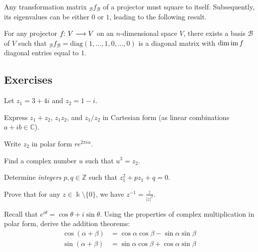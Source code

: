 \documentclass[a4paper, oneside, 12pt]{amsart}
\begin{document}
Any transformation matrix \(_{\mathcal{B}}f_{\mathcal{B}}\) of a projector must square to itself.
Subsequently, its eigenvalues can be either \(0\) or \(1\), leading to the following result.
\begin{proposition}\label{prop:matrix-representation-of-projection}
  For any projector \(f\from V \to V\) on an \(n\)-dimensional space \(V\), there exists a basis \(\mathcal{B}\) of \(V\) such that \(_{\mathcal{B}}f_{\mathcal{B}} = \mathrm{diag}(1, \dots , 1, 0, \dots , 0)\) is a diagonal matrix with \(\dim \operatorname{im} f\) diagonal entries equal to \(1\).
\end{proposition}


\cleardoublepage
\subsection{Exercises}\label{sec:lin-alg-exercises}
\begin{exercise}
  Let \(z_1 = 3 + 4i\) and \(z_2 = 1 - i\).
  \begin{thmlist}
    \item Express \(z_1 + z_2\), \(z_1 z_2\), and \(z_1 / z_2\) in Cartesian form (\ie as linear combinations \(a + ib \in \mathbb{C}\)).
    \item Write \(z_2\) in polar form \(re^{2\pi i \alpha}\).
    \item Find a complex number \(u\) such that \(u^{3}= z_{2}\).
    \item Determine \emph{integers} \(p,q \in \mathbb{Z}\) such that \(z_{1}^{2} + p z_{1} + q = 0\).
    \item Prove that for any \(z \in \Bbbk\setminus\{0\}\), we have \(z^{-1} = \tfrac{\overline{z}}{|z|^{2}}\).
  \end{thmlist}
\end{exercise}

\begin{exercise}
  Recall that \(e^{i\theta} = \cos\theta + i\sin\theta\).
  Using the properties of complex multiplication in polar form, derive the addition theorems:
  \begin{align*}
    \cos(\alpha + \beta) &= \cos\alpha \cos\beta - \sin\alpha \sin\beta \\
    \sin(\alpha + \beta) &= \sin\alpha \cos\beta + \cos\alpha \sin\beta
  \end{align*}
\end{exercise}
\end{document}
